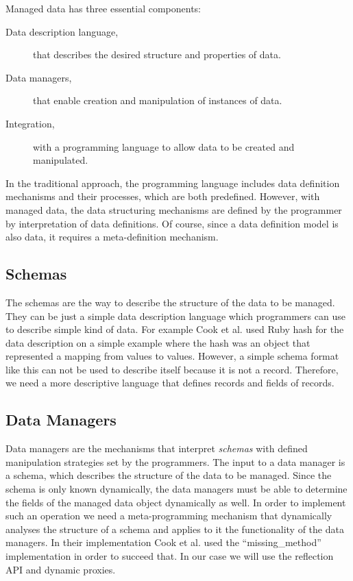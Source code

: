 Managed data has three essential components:

\begin{description}
	\item [Data description language,] that describes the desired structure and properties of data.

	\item [Data managers,] that enable creation and manipulation of instances of data.

	\item [Integration,] with a programming language to allow data to be created and manipulated.
\end{description}

In the traditional approach, the programming language includes data definition mechanisms and their processes, which are both predefined. 
However, with managed data, the data structuring mechanisms are defined by the programmer by interpretation of data definitions.
Of course, since a data definition model is also data, it requires a meta-definition mechanism.

\subsection{Schemas}\label{Schemas}
The schemas are the way to describe the structure of the data to be managed. 
They can be just a simple data description language which programmers can use to describe simple kind of data. 
For example Cook et al. \cite{loh2012managed} used Ruby hash for the data description on a simple example where the hash was an object that represented a mapping from values to values. 
However, a simple schema format like this can not be used to describe itself because it is not a record. 
Therefore, we need a more descriptive language that defines records and fields of records.

\subsection{Data Managers}\label{Data Managers}
Data managers are the mechanisms that interpret \textit{schemas} with defined manipulation strategies set by the programmers. 
The input to a data manager is a schema, which describes the structure of the data to be managed.
Since the schema is only known dynamically, the data managers must be able to determine the fields of the managed data object dynamically as well.
In order to implement such an operation we need a meta-programming mechanism that dynamically analyses the structure of a schema and applies to it the functionality of the data managers.
In their implementation Cook et al. \cite{loh2012managed} used the ``missing\_method'' implementation in order to succeed that.
In our case we will use the reflection API and dynamic proxies.

